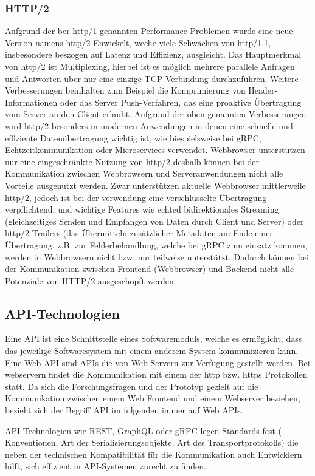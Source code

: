 \subsubsection{HTTP/2}
Aufgrund der ber http/1 genannten Performance Problemen wurde eine neue Version namens http/2 Enwickelt, weche viele Schwächen von http/1.1, insbesondere beszogen auf Latenz und Effizienz, ausgleicht.
Das Hauptmerkmal von http/2 ist Multiplexing, hierbei ist es möglich mehrere parallele Anfragen und Antworten über nur eine einzige TCP-Verbindung durchzuführen.
Weitere Verbesserungen beinhalten zum Beispiel die Komprimierung von Header-Informationen oder das Server Push-Verfahren, das eine proaktive Übertragung vom Server an den Client erlaubt.
Aufgrund der oben genannten Verbesserungen wird http/2 besonders in modernen Anwendungen in denen eine schnelle und effiziente Datenübertragung wichtig ist, wie biespielsweise bei gRPC, Echtzeitkommunikation oder Microservices verwendet.
Webbrowser unterstützen nur eine eingeschränkte Nutzung von http/2 deshalb können bei der Kommunikation zwischen Webbrowsern und Serveranwendungen nicht alle Vorteile ausgenutzt werden. Zwar unterstützen aktuelle Webbrowser mittlerweile http/2, jedoch ist bei der verwendung eine verschlüsselte Übertragung verpflichtend, und wichtige Features wie echted bidirektionales Streaming (gleichzeitiges Senden und Empfangen von Daten durch Client und Server) oder http/2 Trailers (das Übermitteln zusätzlicher Metadaten am Ende einer Übertragung, z.B. zur Fehlerbehandlung, welche bei gRPC zum einsatz kommen, werden in Webbrowsern nicht bzw. nur teilweise unterstützt. Dadurch können bei der Kommunikation zwischen Frontend (Webbrowser) und Backend nicht alle Potenziale von HTTP/2 ausgeschöpft werden 


\subsection{API-Technologien}
Eine API ist eine Schnittstelle eines Softwaremoduls, welche es ermöglicht, dass das jeweilige Softwaresystem mit einem anderem System kommunizieren kann.
Eine Web API sind APIs die von Web-Servern zur Verfügung gestellt werden. Bei webservern findet die Kommunikation mit einem der http bzw. https Protokollen statt. Da sich die Forschungsfragen und der Prototyp gezielt auf die Kommunikation zwischen einem Web Frontend und einem Webserver beziehen, bezieht sich der Begriff API im folgenden immer auf Web APIs.

API Technologien wie REST, GraphQL oder gRPC legen Standards fest ( Konventionen, Art der Serialisierungsobjekte, Art des Transportprotokolls) die neben der technischen Kompatibilität für die Kommunikation auch Entwicklern hilft, sich effizient in API-Systemen zurecht zu finden.


